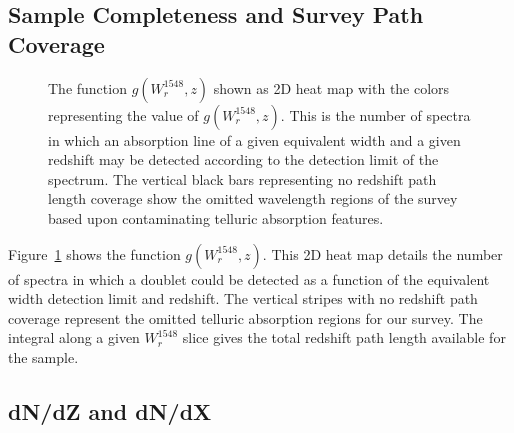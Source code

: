 \documentclass[linenumbers,twocolumn]{aastex61}
\begin{document}

\subsection{Sample Completeness and Survey Path Coverage}

\begin{figure}[bth]
\caption{The function $g(W_r^{1548}, z)$ shown as 2D heat map with the colors representing the value of $g(W_r^{1548}, z)$. This is the number of spectra in which an absorption line of a given equivalent width and a given redshift may be detected according to the detection limit of the spectrum. The vertical black bars representing no redshift path length coverage show the omitted wavelength regions of the survey based upon contaminating telluric absorption features.}
\label{fig:gwz}
\end{figure}

Figure~\ref{fig:gwz} shows the function $g(W_r^{1548}, z)$. This 2D heat map details the number of spectra in which a {\CIVdblt} doublet could be detected as a function of the equivalent width detection limit and redshift. The vertical stripes with no redshift path coverage represent the omitted telluric absorption regions for our survey. The integral along a given $W_r^{1548}$ slice gives the total redshift path length available for the sample.

\subsection{dN/dZ and dN/dX}
\label{dndzdndx}
\end{document}
